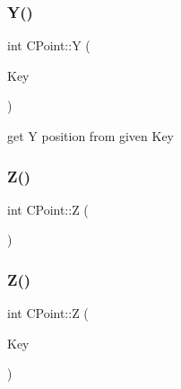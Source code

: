 \mbox{\label{classCPoint_a2760f11ef7f482c28c0385ef402faa9f}} 
\subsubsection{\texorpdfstring{Y()}{Y()}\hspace{0.1cm}{\footnotesize\ttfamily [2/2]}}
{\footnotesize\ttfamily int C\+Point\+::Y (\begin{DoxyParamCaption}\item[{\mbox{\hyperlink{res2dmp_8cpp_a8ae9d53f33f46cfcfcb9736e6351452a}{K\+EY}}}]{Key }\end{DoxyParamCaption})\hspace{0.3cm}{\ttfamily [static]}}



get Y position from given Key 

\mbox{\label{classCPoint_a6d03d17763a148af852d10a9a410167e}} 
\subsubsection{\texorpdfstring{Z()}{Z()}\hspace{0.1cm}{\footnotesize\ttfamily [1/2]}}
{\footnotesize\ttfamily int C\+Point\+::Z (\begin{DoxyParamCaption}{ }\end{DoxyParamCaption})\hspace{0.3cm}{\ttfamily [inline]}}

\mbox{\label{classCPoint_a896823777dbcd50cceec722a9fee6ddb}} 
\subsubsection{\texorpdfstring{Z()}{Z()}\hspace{0.1cm}{\footnotesize\ttfamily [2/2]}}
{\footnotesize\ttfamily int C\+Point\+::Z (\begin{DoxyParamCaption}\item[{\mbox{\hyperlink{res2dmp_8cpp_a8ae9d53f33f46cfcfcb9736e6351452a}{K\+EY}}}]{Key }\end{DoxyParamCaption})\hspace{0.3cm}{\ttfamily [static]}}



